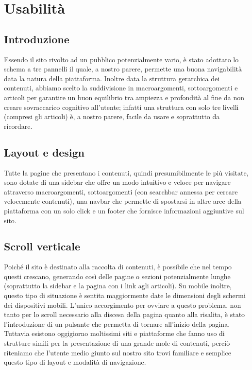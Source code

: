 \documentclass[12pt]{article}
\begin{document}
	\section{Usabilità}
	\subsection{Introduzione}
	Essendo il sito rivolto ad un pubblico potenzialmente vario, è stato adottato lo schema a tre pannelli il quale, a nostro parere, permette una buona navigabilità data la natura della piattaforma. Inoltre data la struttura gerarchica dei contenuti, abbiamo scelto la suddivisione in macroargomenti, sottoargomenti e articoli per garantire un buon equilibrio tra ampiezza e profondità al fine da non creare sovraccarico cognitivo all'utente; infatti una struttura con solo tre livelli (compresi gli articoli) è, a nostro parere, facile da usare e soprattutto da ricordare.
	\subsection{Layout e design}
	Tutte la pagine che presentano i contenuti, quindi presumibilmente le più visitate, sono dotate di una sidebar che offre un modo intuitivo e veloce per navigare attraverso macroargomenti, sottoargomenti (con searchbar annessa per cercare velocemente contenuti), una navbar che permette di spostarsi in altre aree della piattaforma con un solo click e un footer che fornisce informazioni aggiuntive sul sito.
	\subsection{Scroll verticale}
	Poiché il sito è destinato alla raccolta di contenuti, è possibile che nel tempo questi crescano, generando così delle pagine o sezioni potenzialmente lunghe (soprattutto la sidebar e la pagina con i link agli articoli). Su mobile inoltre, questo tipo di situazione è sentita maggiormente date le dimensioni degli schermi dei dispositivi mobili. L'unico accorgimento per ovviare a questo problema, non tanto per lo scroll necessario alla discesa della pagina quanto alla risalita, è stato l'introduzione di un pulsante che permetta di tornare all'inizio della pagina. Tuttavia esistono oggigiorno moltissimi siti e piattaforme che fanno uso di strutture simili per la presentazione di una grande mole di contenuti, perciò riteniamo che l'utente medio giunto sul nostro sito trovi familiare e semplice questo tipo di layout e modalità di navigazione.
	
\end{document}

